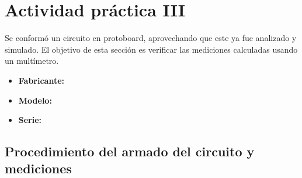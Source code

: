 \section{Actividad práctica III} \sangria{} Se conformó un circuito en protoboard, aprovechando que este ya fue analizado y simulado. El objetivo de esta sección es verificar las mediciones calculadas usando un multímetro.
 \begin{itemize} \item \textbf{Fabricante:} \item \textbf{Modelo:} \item \textbf{Serie:}  \end{itemize}
\subsection{Procedimiento del armado del circuito y mediciones}
